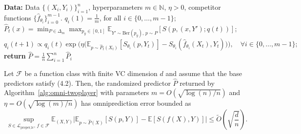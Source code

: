 \begin{algorithm}
\caption{Two-player game based omniprediction} \label{alg:omni-twoplayer}
\begin{algorithmic}[1]
\State \textbf{Data:} Data $\{(X_i, Y_i)\}_{i=1}^n$, hyperparameters $m \in \mathbb{N}$, $\eta > 0$, competitor functions $\{\hat{f}_{\theta_i}\}_{i=0}^{m-1}$.
\State $q_i(1) = \frac{1}{m}$, for all $i \in \{0, \ldots, m-1\}$;
    \State $\hat{P}_t(x) = \min_{P \in \Delta_m} \max_{p_y \in [0,1]} 
        \mathbb{E}_{Y' \sim \text{Ber}(p_y),\, p \sim P}
        [S(p, (x, Y'); q(t))];$
    \State $q_i(t+1) \propto q_i(t) \exp\bigl(\eta \big(\mathbb{E}_{p \sim \hat{P}_t(X_t)}[S_{\theta_i}(p, Y_t)] 
        - S_{\theta_i}(\hat{f}_{\theta_i}(X_t), Y_t)\big)\bigr), \quad \forall i \in \{0, \ldots, m-1\};$
\EndFor
\State \textbf{return} $\hat{P} = \frac{1}{n} \sum_{i=1}^n \hat{P}_i$
\end{algorithmic}
\end{algorithm}

\begin{theorem}\label{thm:omni-twoplayer}
Let $\mathcal{F}$ be a function class with finite VC dimension $d$ and assume that the base predictors satisfy (4.2). Then, the randomized predictor $\hat{P}$ returned by Algorithm~\ref{alg:omni-twoplayer} with parameters $m = O(\sqrt{\log(n)/n})$ and $\eta = O(\sqrt{\log(m)/n})$ has omniprediction error bounded as
\[
    \sup_{S \in \mathcal{L}_{\text{proper,lc}},\, f \in \mathcal{F}}
    \mathbb{E}_{(X,Y)} \big| \mathbb{E}_{p \sim \hat{P}(X)} [S(p, Y)] - \mathbb{E}[S(f(X), Y)] \big|
    \le \tilde{O}\!\left( \sqrt{\frac{d}{n}} \right).
\]
\end{theorem}